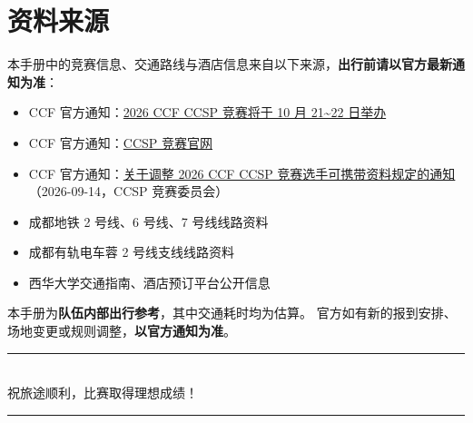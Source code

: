 \documentclass[11pt,a4paper,fontset=windows]{ctexart}
\begin{document}
\newpage

\appendix
\section{资料来源}

本手册中的竞赛信息、交通路线与酒店信息来自以下来源，\textbf{出行前请以官方最新通知为准}：

\begin{itemize}[leftmargin=1.6em,itemsep=0.25em]
  \item CCF 官方通知：\href{https://www.ccf.org.cn/ccsp/tzgg/2026-09-09/931080.shtml}{2026 CCF CCSP 竞赛将于 10 月 21\textasciitilde 22 日举办}
  \item CCF 官方通知：\href{https://www.ccf.org.cn/ccsp/}{CCSP 竞赛官网}
  \item CCF 官方通知：\href{https://www.ccf.org.cn/ccsp/tzgg/2026-09-14/932132.shtml}{关于调整 2026 CCF CCSP 竞赛选手可携带资料规定的通知}（2026-09-14，CCSP 竞赛委员会）
  \item 成都地铁 2 号线、6 号线、7 号线线路资料
  \item 成都有轨电车蓉 2 号线支线线路资料
  \item 西华大学交通指南、酒店预订平台公开信息
\end{itemize}

\begin{warnbox}
本手册为\textbf{队伍内部出行参考}，其中交通耗时均为估算。
官方如有新的报到安排、场地变更或规则调整，\textbf{以官方通知为准}。
\end{warnbox}

\vfill
\begin{center}
{\color{mainlite}\rule{0.6\textwidth}{0.8pt}}\\[0.6em]
{\small\color{graytx} 祝旅途顺利，比赛取得理想成绩！}\\[0.4em]
{\color{mainlite}\rule{0.6\textwidth}{0.8pt}}
\end{center}
\end{document}
